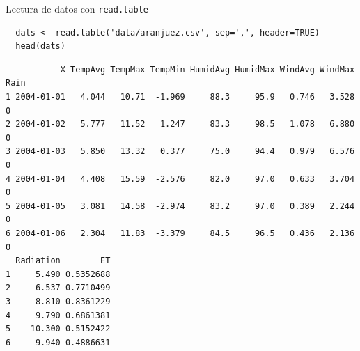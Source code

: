 \documentclass[xcolor={usenames,svgnames,dvipsnames}]{beamer}
\begin{document}
\begin{frame}[fragile,label=sec-5-1-3]{Lectura de datos con \texttt{read.table}}
 \lstset{language=R,label= ,caption= ,numbers=none}
\begin{lstlisting}
  dats <- read.table('data/aranjuez.csv', sep=',', header=TRUE)
  head(dats)
\end{lstlisting}

\begin{verbatim}
           X TempAvg TempMax TempMin HumidAvg HumidMax WindAvg WindMax Rain
1 2004-01-01   4.044   10.71  -1.969     88.3     95.9   0.746   3.528    0
2 2004-01-02   5.777   11.52   1.247     83.3     98.5   1.078   6.880    0
3 2004-01-03   5.850   13.32   0.377     75.0     94.4   0.979   6.576    0
4 2004-01-04   4.408   15.59  -2.576     82.0     97.0   0.633   3.704    0
5 2004-01-05   3.081   14.58  -2.974     83.2     97.0   0.389   2.244    0
6 2004-01-06   2.304   11.83  -3.379     84.5     96.5   0.436   2.136    0
  Radiation        ET
1     5.490 0.5352688
2     6.537 0.7710499
3     8.810 0.8361229
4     9.790 0.6861381
5    10.300 0.5152422
6     9.940 0.4886631
\end{verbatim}
\end{frame}
\end{document}
